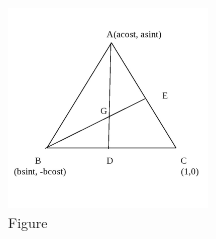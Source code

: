 \documentclass[11pt]{beamer}
\begin{document}
\begin{frame}
\begin{figure}
  \includegraphics[width=200]{fig1.jpg}
  \caption{Figure }
  \label{fig:plot}
\end{figure}
\end{frame}
\end{document}
